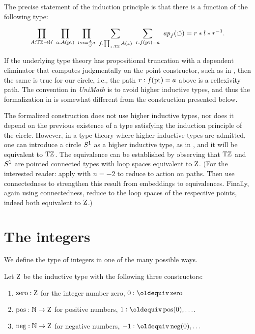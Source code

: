 \documentclass[a4,12pt]{amsart}
\begin{document}
The precise statement of the induction principle is that there is a function of the following type:

\[
\prod_{A: {\mathrm{T}\mathbb{Z}}\to\mathcal{U}}~
\prod_{a: A({\mathord{\mathrm{pt}}})}~
\prod_{l: a=^A_{\circlearrowleft} a}~
\sum_{f: \prod_{z:{\mathrm{T}\mathbb{Z}}} A(z)}~
\sum_{r: f({\mathord{\mathrm{pt}}})= a}~
{\mathop{{\it ap}_{f}}(\circlearrowleft) = r* l * r^{-1}}.
\]

If the underlying type theory has propositional truncation with a dependent eliminator 
that computes judgmentally on the point constructor, such as in \cite[Ch. 6.9]{hottbook},
then the same is true for our circle, i.e., the path $r : f({\mathord{\mathrm{pt}}})= a$ above is a reflexivity path.  
The convention in {\em UniMath} is to avoid higher inductive types, and thus
the formalization in \cite{circleind-Dan} is 
somewhat different from the construction presented below.

The formalized construction does not use higher inductive types, nor does it 
depend on the previous existence of a type satisfying the induction principle of the circle. 
However, in a type theory where higher inductive types are admitted,
one can introduce a circle ${S^1}$ as a higher inductive type, 
as in \cite[Ch. 6.1]{hottbook}, and it will be equivalent to ${\mathrm{T}\mathbb{Z}}$. 
The equivalence can be established by observing that ${\mathrm{T}\mathbb{Z}}$ and ${S^1}$ 
are pointed connected types with loop spaces equivalent to $\mathrm{Z}$.
(For the interested reader: apply \cite[Lemma 7.6.2]{hottbook} with $n=-2$
to reduce to action on paths. Then use connectedness to strengthen
this result from embeddings to equivalences. 
Finally, again using connectedness, reduce to the loop spaces
of the respective points, indeed both equivalent to $\mathrm{Z}$.) 

\section{The integers}
\label{sec:integers}

We define the type of integers in one of the many possible ways.

\begin{definition}\label{def:integers}
Let $\mathrm{Z}$ be the inductive type with the following three constructors:
\begin{enumerate}
\item $\mathop{\mathrm{zero}}: \mathrm{Z}$ for the integer number zero, 
$0 \defeq \zzero$
\item $\mathop{\mathrm{pos}}: \mathbb{N} \to \mathrm{Z}$ for positive numbers,
$1 \defeq \zpos(0),\ldots$.
\item $\mathop{\mathrm{neg}}: \mathbb{N} \to \mathrm{Z}$ for negative numbers, 
$-1 \defeq \zneg(0),\ldots$
\end{enumerate}
\end{definition}
\end{document}
